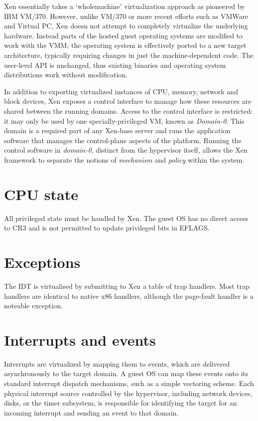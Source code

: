 \documentclass[11pt,twoside,final,openright]{xenstyle}
\begin{document}
Xen essentially takes a `wholemachine' virtualization approach as
pioneered by IBM VM/370.  However, unlike VM/370 or more recent
efforts such as VMWare and Virtual PC, Xen doesn not attempt to
completely virtualize the underlying hardware.  Instead parts of the
hosted guest operating systems are modified to work with the
VMM; the operating system is effectively ported to a new target
architecture, typically requiring changes in just the
machine-dependent code.  The user-level API is unchanged, thus
existing binaries and operating system distributions work without
modification. 

In addition to exporting virtualized instances of CPU, memory, network
and block devices, Xen exposes a control interface to manage how these
resources are shared between the running domains. Access to the
control interface is restricted: it may only be used by one
specially-privileged VM, known as {\em Domain-0}.  This domain is a
required part of any Xen-base server and runs the application software
that manages the control-plane aspects of the platform.  Running the
control software in {\it domain-0}, distinct from the hypervisor
itself, allows the Xen framework to separate the notions of {\it
mechanism} and {\it policy} within the system.


\chapter{CPU state}

All privileged state must be handled by Xen.  The guest OS has no
direct access to CR3 and is not permitted to update privileged bits in
EFLAGS.


\chapter{Exceptions}

The IDT is virtualised by submitting to Xen a table of trap handlers.
Most trap handlers are identical to native x86 handlers, although the
page-fault handler is a noteable exception.


\chapter{Interrupts and events}

Interrupts are virtualized by mapping them to events, which are delivered 
asynchronously to the target domain.  A guest OS can map these events onto
its standard interrupt dispatch mechanisms, such as a simple vectoring 
scheme.  Each physical interrupt source controlled by the hypervisor, including
network devices, disks, or the timer subsystem, is responsible for identifying
the target for an incoming interrupt and sending an event to that domain.
\end{document}
